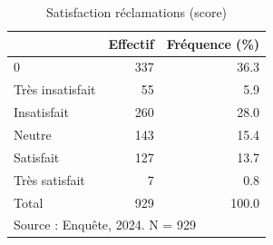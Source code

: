 \begin{table}[htbp]\centering
\def\sym#1{\ifmmode^{#1}\else\(^{#1}\)\fi}
\caption{Satisfaction réclamations (score)}
\begin{tabular}{l*{2}{r}}
\toprule
            &    Effectif&Fréquence (\%)\\
\midrule
0           &         337&        36.3\\
Très insatisfait&          55&         5.9\\
Insatisfait &         260&        28.0\\
Neutre      &         143&        15.4\\
Satisfait   &         127&        13.7\\
Très satisfait&           7&         0.8\\
Total       &         929&       100.0\\
\bottomrule
\multicolumn{3}{l}{\footnotesize Source : Enquête, 2024. N = 929}\\
\end{tabular}
\end{table}
